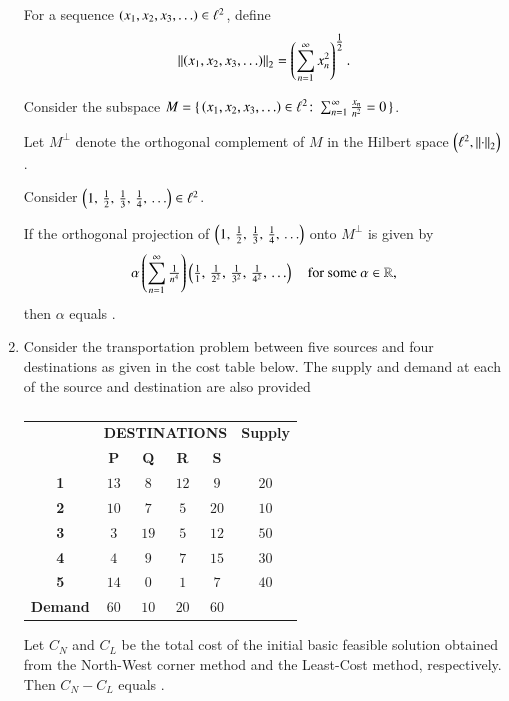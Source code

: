 \documentclass[journal,12pt,onecolumn]{IEEEtran}
\theoremstyle{remark}
\begin{document}
\begin{enumerate}[start=1, label=Q.\arabic*]
For a sequence $\left(x_{1},x_{2},x_{3},\ldots\right) \in \ell^{2}$, define
\[
\left\lVert\left(x_{1},x_{2},x_{3},\ldots\right)\right\rVert_{2} = \left(\sum_{n=1}^{\infty} x_{n}^{2}\right)^{\tfrac{1}{2}}.
\]

Consider the subspace $M=\{\, \left(x_{1},x_{2},x_{3},\ldots\right) \in \ell^{2} \colon \sum_{n=1}^{\infty} \tfrac{x_{n}}{n^{2}}=0 \,\}$.  

Let $M^{\perp}$ denote the orthogonal complement of $M$ in the Hilbert space $\left(\ell^{2},\left\lVert\cdot\right\rVert_{2}\right)$.  

Consider $\left(1,\, \tfrac{1}{2},\, \tfrac{1}{3},\, \tfrac{1}{4},\, \ldots\right) \in \ell^{2}$.  

If the orthogonal projection of $\left(1,\, \tfrac{1}{2},\, \tfrac{1}{3},\, \tfrac{1}{4},\, \ldots\right)$ onto $M^{\perp}$ is given by
\[
\alpha \left(\sum_{n=1}^{\infty} \tfrac{1}{n^{4}}\right)\left(\tfrac{1}{1},\, \tfrac{1}{2^{2}},\, \tfrac{1}{3^{2}},\, \tfrac{1}{4^{2}},\, \ldots\right) \quad \text{for some } \alpha \in \mathbb{R},
\]
then $\alpha$ equals \underline{\hspace{3cm}}.

\hfill{}
\item Consider the transportation problem between five sources and four destinations as given in the cost table below. The supply and demand at each of the source and destination are also provided\brak{:}

\begin{table}[h!]
\centering
\caption*{}
\label{tab:tp_cost}
\begin{tabular}{c|c|c|c|c|c}
\multicolumn{1}{c}{} & \multicolumn{4}{c}{\textbf{DESTINATIONS}} & \textbf{Supply}\\
\cline{2-5}
\multicolumn{1}{c|}{} & \textbf{P} & \textbf{Q} & \textbf{R} & \textbf{S} &  \\
\hline
\textbf{1} & $13$ & $8$ & $12$ & $9$ & $20$\\
\textbf{2} & $10$ & $7$ & $5$ & $20$ & $10$\\
\textbf{3} & $3$ & $19$ & $5$ & $12$ & $50$\\
\textbf{4} & $4$ & $9$ & $7$ & $15$ & $30$\\
\textbf{5} & $14$ & $0$ & $1$ & $7$ & $40$\\
\hline
\textbf{Demand} & $60$ & $10$ & $20$ & $60$ & \\
\hline
\end{tabular}
\end{table}

Let $C_{N}$ and $C_{L}$ be the total cost of the initial basic feasible solution obtained from the North\mbox{-}West corner method and the Least\mbox{-}Cost method, respectively. Then $C_{N}-C_{L}$ equals \underline{\hspace{2cm}}.


\end{enumerate}
\end{document}
